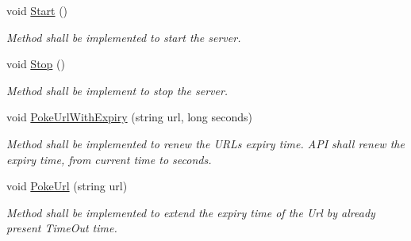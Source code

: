 \begin{DoxyCompactItemize}
void \mbox{\hyperlink{interface_concord_1_1_c3_http_module_1_1_i_web_server_a9f361fa34fa5c93d792e32a3ce8969cf}{Start}} ()
\begin{DoxyCompactList}\small\item\em Method shall be implemented to start the server. \end{DoxyCompactList}\item 
void \mbox{\hyperlink{interface_concord_1_1_c3_http_module_1_1_i_web_server_a800e9a97640440f79e356cf3fa3ddbf8}{Stop}} ()
\begin{DoxyCompactList}\small\item\em Method shall be implement to stop the server. \end{DoxyCompactList}\item 
void \mbox{\hyperlink{interface_concord_1_1_c3_http_module_1_1_i_web_server_a4d16137e82bd2416f07c86701d8506ff}{Poke\+Url\+With\+Expiry}} (string url, long seconds)
\begin{DoxyCompactList}\small\item\em Method shall be implemented to renew the U\+R\+Ls expiry time. A\+PI shall \textquotesingle{}renew\textquotesingle{} the expiry time, from current time to seconds. \end{DoxyCompactList}\item 
void \mbox{\hyperlink{interface_concord_1_1_c3_http_module_1_1_i_web_server_a54d1254c7264250739d47175c1d1929d}{Poke\+Url}} (string url)
\begin{DoxyCompactList}\small\item\em Method shall be implemented to extend the expiry time of the Url by already present Time\+Out time. \end{DoxyCompactList}\end{DoxyCompactItemize}
